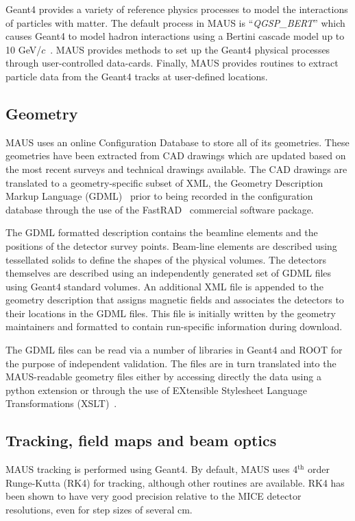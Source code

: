 \documentclass[11pt,a4paper]{article}
\begin{document}
Geant4 provides a variety of reference physics processes to model the interactions of particles with matter. The default process in MAUS is ``\emph{QGSP\_BERT}'' which causes Geant4 to model hadron interactions using a Bertini cascade model up to 10 GeV/$c$~\cite{GEANT4HPhysics}. MAUS provides methods to set up the Geant4 physical processes through user-controlled data-cards. Finally, MAUS provides routines to extract particle data from the Geant4 tracks at user-defined locations.

\subsection{Geometry}\label{sec:geo}

MAUS uses an online Configuration Database to store all of its
geometries. These geometries have been extracted from CAD drawings
which are  updated based on the most recent surveys and technical drawings
available. The CAD drawings are translated to a geometry-specific
subset of XML, the Geometry Description Markup Language (GDML)~\cite{GDML} prior
to being recorded in the configuration database through the use of the 
FastRAD~\cite{fastrad} commercial software package. 

The GDML formatted description contains the beamline elements and the positions of
the detector survey points. Beam-line elements are described using 
tessellated solids to define the shapes of the physical
volumes. The detectors themselves are described using an independently
generated set of GDML files using Geant4 standard volumes. An
additional XML file is appended to the geometry description that
assigns magnetic fields and associates the detectors to their
locations in the GDML files. This file is
initially written by the geometry maintainers and formatted to contain
run-specific information during download.

The GDML files can be read via a
number of  libraries in Geant4 and ROOT for the
purpose of independent validation. The files are in turn translated into the MAUS-readable
geometry files either by accessing directly the data using a python
extension or through the use of EXtensible Stylesheet Language Transformations
(XSLT)~\cite{xslt}.

\subsection{Tracking, field maps and beam optics}\label{sec:fieldoptics}
MAUS tracking is performed using Geant4. By default, MAUS uses 4$^\mathrm{th}$ order Runge-Kutta (RK4) for tracking, although other routines are available. RK4 has been shown to have very good precision relative to the MICE detector resolutions, even for step sizes of several cm.
\end{document}

